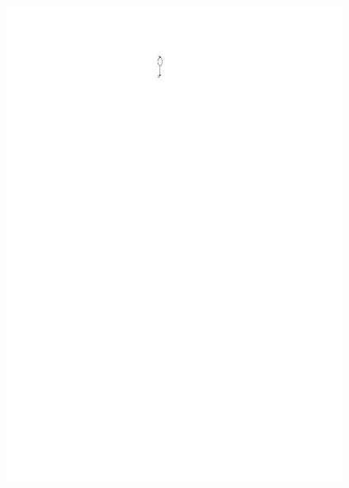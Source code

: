 \documentclass[a4paper]{article}
\theoremstyle{definition}
\begin{document}
\begin{figure}[htbp]
\begin{center}
{\includegraphics[scale=1.5]{fig/he2}}
\hspace{2cm}

\end{center}
\end{figure}
\end{document}
